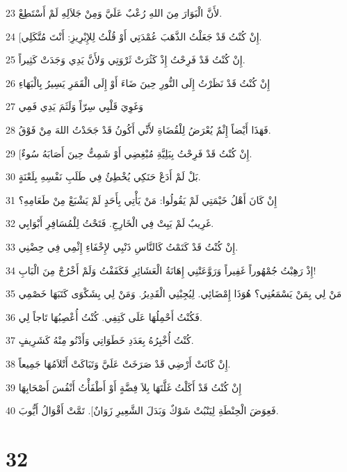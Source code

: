 \par 23 لأَنَّ الْبَوَارَ مِنَ اللهِ رُعْبٌ عَلَيَّ وَمِنْ جَلاَلِهِ لَمْ أَسْتَطِعْ.
\par 24 [إِنْ كُنْتُ قَدْ جَعَلْتُ الذَّهَبَ عُمْدَتِي أَوْ قُلْتُ لِلإِبْرِيزِ: أَنْتَ مُتَّكَلِي.
\par 25 إِنْ كُنْتُ قَدْ فَرِحْتُ إِذْ كَثُرَتْ ثَرْوَتِي وَلأَنَّ يَدِي وَجَدَتْ كَثِيراً.
\par 26 إِنْ كُنْتُ قَدْ نَظَرْتُ إِلَى النُّورِ حِينَ ضَاءَ أَوْ إِلَى الْقَمَرِ يَسِيرُ بِالْبَهَاءِ
\par 27 وَغَوِيَ قَلْبِي سِرّاً وَلَثَمَ يَدِي فَمِي
\par 28 فَهَذَا أَيْضاً إِثْمٌ يُعْرَضُ لِلْقُضَاةِ لأَنِّي أَكُونُ قَدْ جَحَدْتُ اللهَ مِنْ فَوْقُ.
\par 29 [إِنْ كُنْتُ قَدْ فَرِحْتُ بِبَلِيَّةِ مُبْغِضِي أَوْ شَمِتُّ حِينَ أَصَابَهُ سُوءٌ.
\par 30 بَلْ لَمْ أَدَعْ حَنَكِي يُخْطِئُ فِي طَلَبِ نَفْسِهِ بِلَعْنَةٍ.
\par 31 إِنْ كَانَ أَهْلُ خَيْمَتِي لَمْ يَقُولُوا: مَنْ يَأْتِي بِأَحَدٍ لَمْ يَشْبَعْ مِنْ طَعَامِهِ؟
\par 32 غَرِيبٌ لَمْ يَبِتْ فِي الْخَارِجِ. فَتَحْتُ لِلْمُسَافِرِ أَبْوَابِي.
\par 33 إِنْ كُنْتُ قَدْ كَتَمْتُ كَالنَّاسِ ذَنْبِي لإِخْفَاءِ إِثْمِي فِي حِضْنِي.
\par 34 إِذْ رَهِبْتُ جُمْهُوراً غَفِيراً وَرَوَّعَتْنِي إِهَانَةُ الْعَشَائِرِ فَكَفَفْتُ وَلَمْ أَخْرُجْ مِنَ الْبَابِ!
\par 35 مَنْ لِي بِمَنْ يَسْمَعُنِي؟ هُوَذَا إِمْضَائِي. لِيُجِبْنِي الْقَدِيرُ. وَمَنْ لِي بِشَكْوَى كَتَبَهَا خَصْمِي
\par 36 فَكُنْتُ أَحْمِلُهَا عَلَى كَتِفِي. كُنْتُ أُعْصِبُهَا تَاجاً لِي.
\par 37 كُنْتُ أُخْبِرُهُ بِعَدَدِ خَطَوَاتِي وَأَدْنُو مِنْهُ كَشَرِيفٍ.
\par 38 إِنْ كَانَتْ أَرْضِي قَدْ صَرَخَتْ عَلَيَّ وَتَبَاكَتْ أَتْلاَمُهَا جَمِيعاً.
\par 39 إِنْ كُنْتُ قَدْ أَكَلْتُ غَلَّتَهَا بِلاَ فِضَّةٍ أَوْ أَطْفَأْتُ أَنْفُسَ أَصْحَابِهَا
\par 40 فَعِوَضَ الْحِنْطَةِ لِيَنْبُتْ شَوْكٌ وَبَدَلَ الشَّعِيرِ زَوَانٌ]. تَمَّتْ أَقْوَالُ أَيُّوبَ.

\chapter{32}

